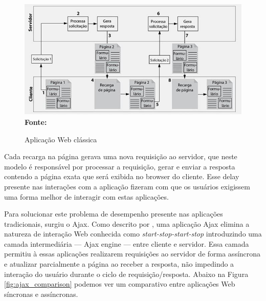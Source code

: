 \begin{figure}[!ht]
	\centering	
	\caption[\hspace{0.1cm}Aplicação Web clássica.]{Aplicação Web clássica}
	  \vspace{-0.4cm}
	\includegraphics[width=.8\textwidth]{figuras/arquitetura_web_tradicional.png}
	 \vspace{-0.3cm}
	\\\textbf{\footnotesize Fonte: \cite{deitelAjax}}
	\label{fig:arquitetura_web_tradicional}
\end{figure}

Cada recarga na página gerava uma nova requisição ao servidor, que neste modelo é responsável por processar a requisição, gerar e enviar a resposta 
contendo a página exata que será exibida no browser do cliente. Esse delay presente nas interações com a aplicação fizeram com que os usuários 
exigissem uma forma melhor de interagir com estas aplicações. 

Para solucionar este problema de desempenho presente nas aplicações tradicionais, surgiu o Ajax. Como descrito por \cite{garrettAjax}, uma aplicação
Ajax elimina a natureza de interação Web conhecida como \textit{start-stop-start-stop} introduzindo uma camada intermediária — Ajax engine — entre 
cliente e servidor. Essa camada permitiu à essas aplicações realizarem requisições ao servidor de forma assíncrona e atualizar parcialmente a 
página ao receber a resposta, não impedindo a interação do usuário durante o ciclo de requisição/resposta. Abaixo na Figura \ref{fig:ajax_comparison} 
podemos ver um comparativo entre aplicações Web síncronas e assíncronas.

